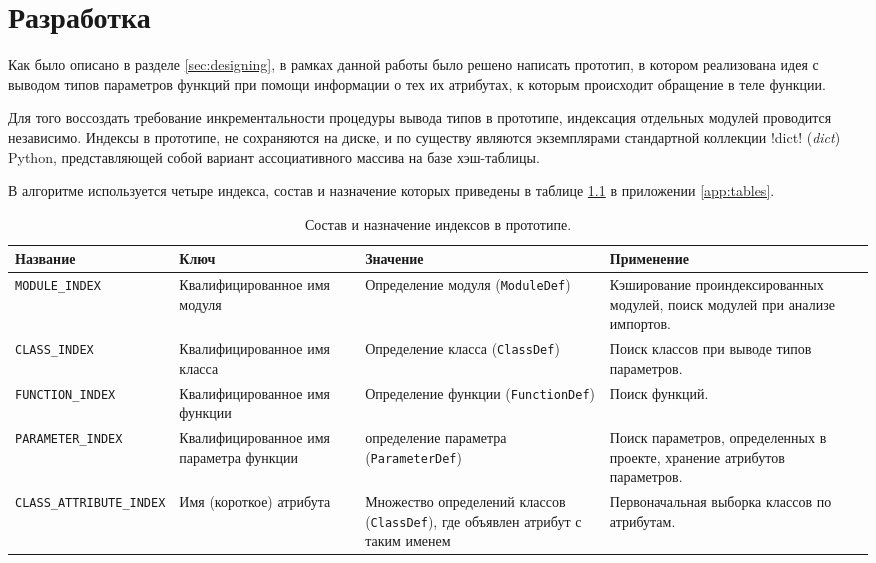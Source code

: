 \chapter{Разработка}
\label{sec:development}

Как было описано в разделе \ref{sec:designing}, в рамках
данной работы было решено написать прототип, в котором реализована идея с
выводом типов параметров функций при помощи информации о тех их атрибутах, к
которым происходит обращение в теле функции. 

Для того воссоздать требование инкрементальности процедуры вывода типов в
прототипе, индексация отдельных модулей проводится независимо. Индексы в
прототипе, не сохраняются на диске, и по существу являются экземплярами
стандартной коллекции !dict! (\emph{dict}) Python, представляющей собой
вариант ассоциативного массива на базе хэш-таблицы.

В алгоритме используется четыре индекса, состав и назначение которых приведены в
  таблице \ref{tab:indexes-ref} в приложении \ref{app:tables}.

\begin{table}
\small
\caption{Состав и назначение индексов в прототипе.}
\label{tab:indexes-ref}
\begin{tabularx}{\textwidth}{ |X|X|X|X| }
  \hline
  Название & Ключ & Значение & Применение \\
  \hline
  \texttt{MODULE\_INDEX} & Квалифицированное имя модуля & Определение модуля
  (\texttt{ModuleDef})
  &  Кэширование проиндексированных модулей, поиск модулей при анализе импортов.
  \\ \hline

  \texttt{CLASS\_INDEX} & Квалифицированное имя класса & Определение класса
  (\texttt{ClassDef})
  & Поиск классов при выводе типов параметров. \\ \hline 

  \texttt{FUNCTION\_INDEX} & Квалифицированное имя функции & Определение функции
  (\texttt{FunctionDef}) & Поиск функций. \\ \hline

  \texttt{PARAMETER\_INDEX} & Квалифицированное имя параметра функции & определение
  параметра (\texttt{ParameterDef}) & Поиск параметров, определенных в проекте,
  хранение атрибутов параметров. \\ \hline

  \texttt{CLASS\_ATTRIBUTE\_INDEX} & Имя (короткое) атрибута & Множество
  определений классов (\texttt{ClassDef}), где 
  объявлен атрибут с таким именем & Первоначальная выборка классов по атрибутам.
  \\ \hline

\end{tabularx}
\end{table}

